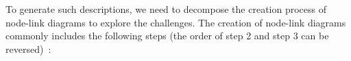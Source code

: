 To generate such descriptions, we need to decompose the creation process of node-link diagrams to explore the challenges.
The creation of node-link diagrams commonly includes the following steps (the order of step 2 and step 3 can be reversed)~\cite{DBLP:journals/cgf/SpritzerBDFF15, tvcg/RomatAP21}:
